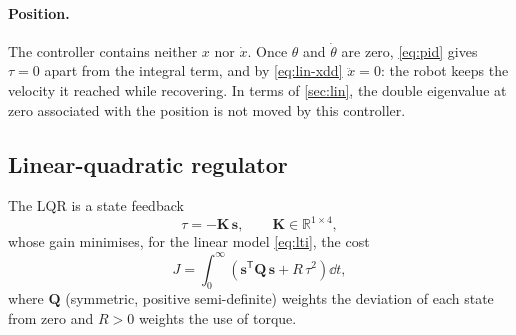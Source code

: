 \paragraph{Position.} The controller contains neither $x$ nor $\dot x$. Once
$\theta$ and $\dot\theta$ are zero, \cref{eq:pid} gives $\tau = 0$ apart from the
integral term, and by \cref{eq:lin-xdd} $\ddot x = 0$: the robot keeps the
velocity it reached while recovering. In terms of \cref{sec:lin}, the double
eigenvalue at zero associated with the position is not moved by this controller.

\subsection{Linear-quadratic regulator}

The LQR is a state feedback
\begin{equation}
  \tau = -\bm K\,\bm s , \qquad \bm K \in \mathbb R^{1\times4},
\end{equation}
whose gain minimises, for the linear model \cref{eq:lti}, the cost
\begin{equation}
  J = \int_0^\infty \left(\bm s^{\mathsf T}\bm Q\,\bm s + R\,\tau^2\right)\dd t ,
\end{equation}
where $\bm Q$ (symmetric, positive semi-definite) weights the deviation of each
state from zero and $R > 0$ weights the use of torque.

